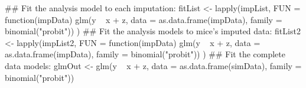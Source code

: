 \begin{Schunk}
\begin{Sinput}
 ## Fit the analysis model to each imputation:
 fitList <- lapply(impList,
                   FUN = function(impData) {
                       glm(y ~ x + z,
                           data = as.data.frame(impData),
                           family = binomial("probit"))
                   })
 ## Fit the analysis models to mice's imputed data:
 fitList2 <- lapply(impList2,
                    FUN = function(impData) {
                        glm(y ~ x + z,
                            data = as.data.frame(impData),
                            family = binomial("probit"))
                    })
 ## Fit the complete data models:
 glmOut <- glm(y ~ x + z,
               data = as.data.frame(simData),
               family = binomial("probit"))
\end{Sinput}
\end{Schunk}
